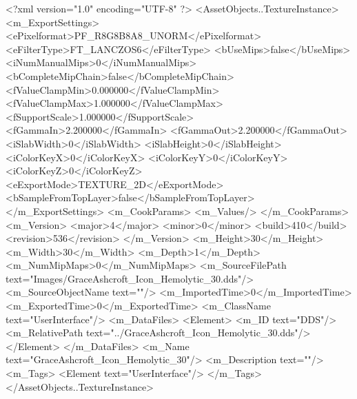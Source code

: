 <?xml version="1.0" encoding="UTF-8" ?>
<AssetObjects..TextureInstance>
	<m_ExportSettings>
		<ePixelformat>PF_R8G8B8A8_UNORM</ePixelformat>
		<eFilterType>FT_LANCZOS6</eFilterType>
		<bUseMips>false</bUseMips>
		<iNumManualMips>0</iNumManualMips>
		<bCompleteMipChain>false</bCompleteMipChain>
		<fValueClampMin>0.000000</fValueClampMin>
		<fValueClampMax>1.000000</fValueClampMax>
		<fSupportScale>1.000000</fSupportScale>
		<fGammaIn>2.200000</fGammaIn>
		<fGammaOut>2.200000</fGammaOut>
		<iSlabWidth>0</iSlabWidth>
		<iSlabHeight>0</iSlabHeight>
		<iColorKeyX>0</iColorKeyX>
		<iColorKeyY>0</iColorKeyY>
		<iColorKeyZ>0</iColorKeyZ>
		<eExportMode>TEXTURE_2D</eExportMode>
		<bSampleFromTopLayer>false</bSampleFromTopLayer>
	</m_ExportSettings>
	<m_CookParams>
		<m_Values/>
	</m_CookParams>
	<m_Version>
		<major>4</major>
		<minor>0</minor>
		<build>410</build>
		<revision>536</revision>
	</m_Version>
	<m_Height>30</m_Height>
	<m_Width>30</m_Width>
	<m_Depth>1</m_Depth>
	<m_NumMipMaps>0</m_NumMipMaps>
	<m_SourceFilePath text="Images/GraceAshcroft_Icon_Hemolytic_30.dds"/>
	<m_SourceObjectName text=""/>
	<m_ImportedTime>0</m_ImportedTime>
	<m_ExportedTime>0</m_ExportedTime>
	<m_ClassName text="UserInterface"/>
	<m_DataFiles>
		<Element>
			<m_ID text="DDS"/>
			<m_RelativePath text="../GraceAshcroft_Icon_Hemolytic_30.dds"/>
		</Element>
	</m_DataFiles>
	<m_Name text="GraceAshcroft_Icon_Hemolytic_30"/>
	<m_Description text=""/>
	<m_Tags>
		<Element text="UserInterface"/>
	</m_Tags>
</AssetObjects..TextureInstance>

